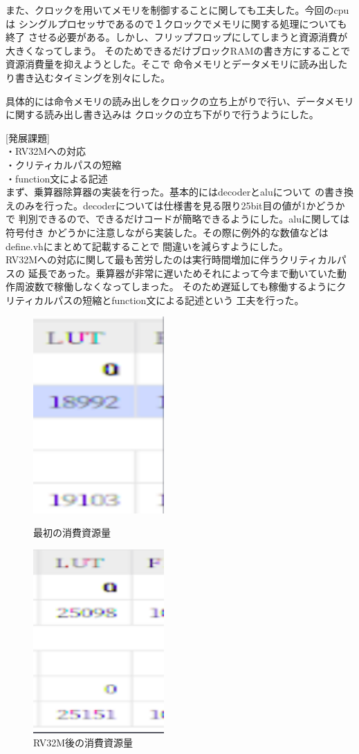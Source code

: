 \documentclass[12pt]{jreport}
\begin{document}
  また、クロックを用いてメモリを制御することに関しても工夫した。今回のcpuは
  シングルプロセッサであるので１クロックでメモリに関する処理についても終了
  させる必要がある。しかし、フリップフロップにしてしまうと資源消費が大きくなってしまう。
  そのためできるだけブロックRAMの書き方にすることで資源消費量を抑えようとした。そこで
  命令メモリとデータメモリに読み出したり書き込むタイミングを別々にした。


  具体的には命令メモリの読み出しをクロックの立ち上がりで行い、データメモリに関する読み出し書き込みは
  クロックの立ち下がりで行うようにした。

  [発展課題]\\
  ・RV32Mへの対応\\
  ・クリティカルパスの短縮\\
  ・function文による記述\\

  まず、乗算器除算器の実装を行った。基本的にはdecoderとaluについて
  の書き換えのみを行った。decoderについては仕様書を見る限り25bit目の値が1かどうかで
  判別できるので、できるだけコードが簡略できるようにした。aluに関しては符号付き
  かどうかに注意しながら実装した。その際に例外的な数値などはdefine.vhにまとめて記載することで
  間違いを減らすようにした。\\
  RV32Mへの対応に関して最も苦労したのは実行時間増加に伴うクリティカルパスの
  延長であった。乗算器が非常に遅いためそれによって今まで動いていた動作周波数で稼働しなくなってしまった。
  そのため遅延しても稼働するようにクリティカルパスの短縮とfunction文による記述という
  工夫を行った。
  \begin{figure}
    \centering
    \includegraphics[width=5cm]{picture/lut1.png}
    \caption{最初の消費資源量}
    \includegraphics[width=5cm]{picture/lut2.png}
    \caption{RV32M後の消費資源量}
  \end{figure}
  
\end{document}
